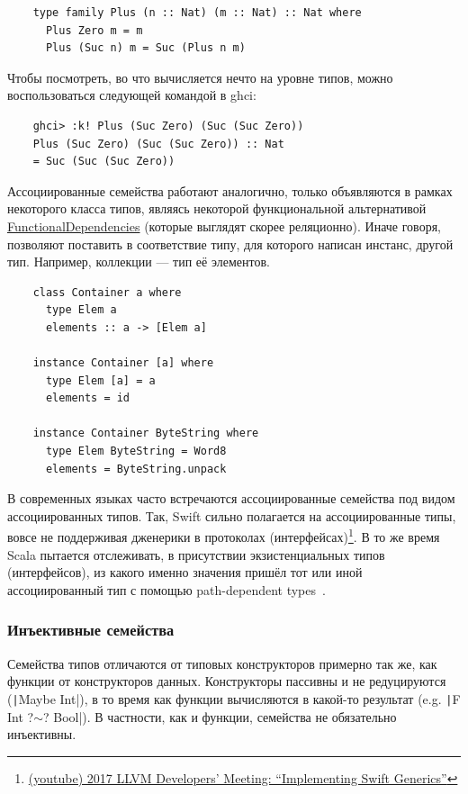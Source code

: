 \begin{verbatim}
    type family Plus (n :: Nat) (m :: Nat) :: Nat where
      Plus Zero m = m
      Plus (Suc n) m = Suc (Plus n m)
\end{verbatim}

Чтобы посмотреть, во что вычисляется нечто на уровне типов, можно воспользоваться следующей командой в ghci:
\begin{verbatim}
    ghci> :k! Plus (Suc Zero) (Suc (Suc Zero))
    Plus (Suc Zero) (Suc (Suc Zero)) :: Nat
    = Suc (Suc (Suc Zero))
\end{verbatim}

Ассоциированные семейства работают аналогично, только объявляются в рамках некоторого класса типов, являясь некоторой функциональной альтернативой \href{https://ghc.gitlab.haskell.org/ghc/doc/users_guide/exts/functional_dependencies.html}{FunctionalDependencies} (которые выглядят скорее реляционно).
Иначе говоря, позволяют поставить в соответствие типу, для которого написан инстанс, другой тип.
Например, коллекции --- тип её элементов.

\begin{verbatim}
    class Container a where
      type Elem a
      elements :: a -> [Elem a]

    instance Container [a] where
      type Elem [a] = a
      elements = id

    instance Container ByteString where
      type Elem ByteString = Word8
      elements = ByteString.unpack
\end{verbatim}

В современных языках часто встречаются ассоциированные семейства под видом ассоциированных типов.
Так, Swift сильно полагается на ассоциированные типы, вовсе не поддерживая дженерики в протоколах (интерфейсах)\footnote{\href{https://youtu.be/ctS8FzqcRug?si=y_ZYnuUOulA33d_X}{(youtube) 2017 LLVM Developers’ Meeting: ``Implementing Swift Generics''}}.
В то же время Scala пытается отслеживать, в присутствии экзистенциальных типов (интерфейсов), из какого именно значения пришёл тот или иной ассоциированный тип с помощью path-dependent types~\cite{amin2014foundations}.

\subsubsection{Инъективные семейства}

Семейства типов отличаются от типовых конструкторов примерно так же, как функции от конструкторов данных.
Конструкторы пассивны и не редуцируются (\texttt|Maybe Int|), в то время как функции вычисляются в какой-то результат (e.g. \texttt|F Int ?$\sim$? Bool|).
В частности, как и функции, семейства не обязательно инъективны.

